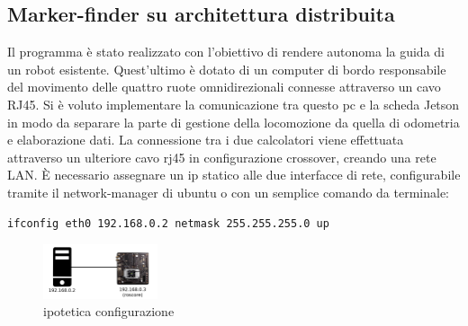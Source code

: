 \documentclass[a4paper]{article}
\begin{document}

\subsection{Marker-finder su architettura distribuita}
Il programma è stato realizzato con l'obiettivo di rendere autonoma la guida di un robot esistente. 
Quest'ultimo è dotato di un computer di bordo responsabile del movimento delle quattro ruote omnidirezionali connesse attraverso un cavo RJ45.
Si è voluto implementare la comunicazione tra questo pc e la scheda Jetson in modo da separare la parte di gestione della locomozione da quella di odometria e elaborazione dati.
La connessione tra i due calcolatori viene effettuata attraverso un ulteriore cavo rj45 in configurazione crossover, creando una rete LAN.
È  necessario assegnare un ip statico alle due interfacce di rete, configurabile tramite il network-manager di ubuntu o con un semplice comando da terminale:
\begin{verbatim}
ifconfig eth0 192.168.0.2 netmask 255.255.255.0 up
\end{verbatim}

\begin{figure}
    \centering
    \includegraphics [width=0.3\textwidth] {lanRos.png}
    \caption{ipotetica configurazione}
    \label{fig:lan}
\end{figure}
\end{document}
